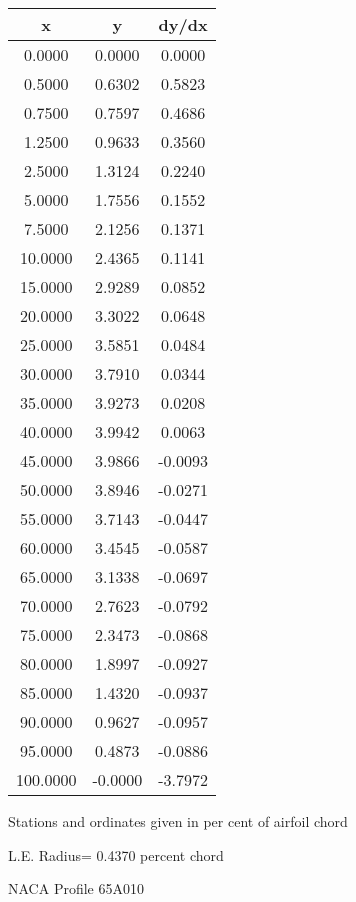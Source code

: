 \documentclass[11pt]{book}
\begin{document}
 \vspace{8mm}
 \begin{tabular}{|c|c|c|} \hline 
  x  &  y  &  dy/dx \\
 \hline
0.0000 & 0.0000 & 0.0000 \\
0.5000 & 0.6302 & 0.5823 \\
0.7500 & 0.7597 & 0.4686 \\
1.2500 & 0.9633 & 0.3560 \\
2.5000 & 1.3124 & 0.2240 \\
5.0000 & 1.7556 & 0.1552 \\
7.5000 & 2.1256 & 0.1371 \\
10.0000 & 2.4365 & 0.1141 \\
15.0000 & 2.9289 & 0.0852 \\
20.0000 & 3.3022 & 0.0648 \\
25.0000 & 3.5851 & 0.0484 \\
30.0000 & 3.7910 & 0.0344 \\
35.0000 & 3.9273 & 0.0208 \\
40.0000 & 3.9942 & 0.0063 \\
45.0000 & 3.9866 & -0.0093 \\
50.0000 & 3.8946 & -0.0271 \\
55.0000 & 3.7143 & -0.0447 \\
60.0000 & 3.4545 & -0.0587 \\
65.0000 & 3.1338 & -0.0697 \\
70.0000 & 2.7623 & -0.0792 \\
75.0000 & 2.3473 & -0.0868 \\
80.0000 & 1.8997 & -0.0927 \\
85.0000 & 1.4320 & -0.0937 \\
90.0000 & 0.9627 & -0.0957 \\
95.0000 & 0.4873 & -0.0886 \\
100.0000 & -0.0000 & -3.7972 \\
 \hline
 \end{tabular}
 \vspace{8mm}


Stations and ordinates given in per cent of airfoil chord 


L.E. Radius=  0.4370 percent chord
 \newpage
  \label{p65A010}
 \begin{Large}
 NACA Profile 65A010
 \end{Large}
  
\end{document}
